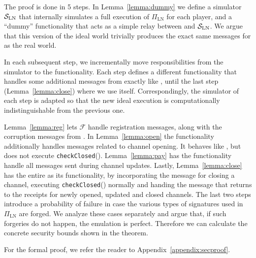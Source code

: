   \begin{proofsketch}
    The proof is done in 5 steps. In Lemma~\ref{lemma:dummy} we define a
    simulator $\mathcal{S}_{\mathrm{LN}}$ that internally simulates a full
    execution of $\Pi_{\mathrm{LN}}$ for each player, and a ``dummy''
    functionality that acts as a simple relay between \environment{} and
    $\mathcal{S}_{\mathrm{LN}}$. We argue that this version of the ideal world
    trivially produces the exact same messages for \environment{} as the real
    world.

    In each subsequent step, we incrementally move responsibilities from the
    simulator to the functionality. Each step defines a different functionality
    that handles some additional messages from \environment{} exactly like
    \fpaynet, until the last step (Lemma~\ref{lemma:close}) where we use
    \fpaynet{} itself. Correspondingly, the simulator of each step is adapted so
    that the new ideal execution is computationally indistinguishable from the
    previous one.

    Lemma~\ref{lemma:reg} lets $\mathcal{F}$ handle registration messages,
    along with the corruption messages from \simulator. In Lemma~\ref{lemma:open}
    the functionality additionally handles messages related to channel opening. It
    behaves like \fpaynet, but does not execute \texttt{checkClosed}().
    Lemma~\ref{lemma:pay} has the functionality handle all messages sent during
    channel updates. Lastly, Lemma~\ref{lemma:close} has the entire \fpaynet{} as
    its functionality, by incorporating the message for closing a channel,
    executing \texttt{checkClosed}() normally and handing the message that returns
    to \environment{} the receipts for newly opened, updated and closed
    channels. The last two steps introduce a probability of failure in case
    the various types of signatures used in  $\Pi_{\mathrm{LN}}$ are forged. We analyze these cases separately and argue that, if
    such forgeries do not happen, the emulation is perfect. Therefore we can
    calculate the concrete security bounds shown in the theorem.
  \end{proofsketch}
  For the formal proof, we refer the reader to Appendix~\ref{appendix:secproof}.
